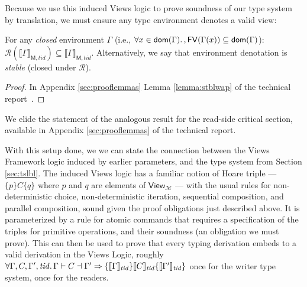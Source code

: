 
Because we use this induced Views logic to prove soundness of our type system by translation, we must ensure any type environment denotes a valid view:
\begin{lemma}\label{lemma:stblw}
For any \emph{closed} environment $\Gamma$ (i.e., $\forall x\in\mathsf{dom}(\Gamma)\ldotp, \mathsf{FV}(\Gamma(x))\subseteq\mathsf{dom}(\Gamma)$):
$
\mathcal{R}(\llbracket\Gamma\rrbracket_{\mathsf{M},tid})\subseteq\llbracket\Gamma\rrbracket_{\mathsf{M},tid}
$.
Alternatively, we say that environment denotation is \emph{stable} (closed under $\mathcal{R}$).
\end{lemma}
\begin{proof}
In Appendix \ref{sec:prooflemmas} Lemma \ref{lemma:stblwap} of the technical report~\cite{isotek}.
\end{proof}
We elide the statement of the analogous result for the read-side critical section, available in Appendix \ref{sec:prooflemmas} of the technical report.

With this setup done, we we can state the connection between the Views Framework logic induced by earlier parameters, and the type system from Section \ref{sec:tslbl}.
The induced Views logic has a familiar notion of Hoare triple --- $\{ p \} C \{ q \}$ where $p$ and $q$ are elements of $\mathsf{View}_\mathcal{M}$ --- with the usual rules for non-deterministic choice, non-deterministic iteration, sequential composition, and parallel composition, sound given the proof obligations just described above.  It is parameterized by a rule for atomic commands that requires a specification of the triples for primitive operations, and their soundness (an obligation we must prove).  This can then be used to prove that every typing derivation embeds to a valid derivation in the Views Logic, roughly
$\forall\Gamma,C,\Gamma',\mathit{tid}\ldotp\Gamma\vdash C\dashv \Gamma' \Rightarrow \{\llbracket\Gamma\rrbracket_\mathit{tid}\} \llbracket C\rrbracket_\mathit{tid}\{\llbracket\Gamma'\rrbracket_\mathit{tid}\}$
once for the writer type system, once for the readers.

